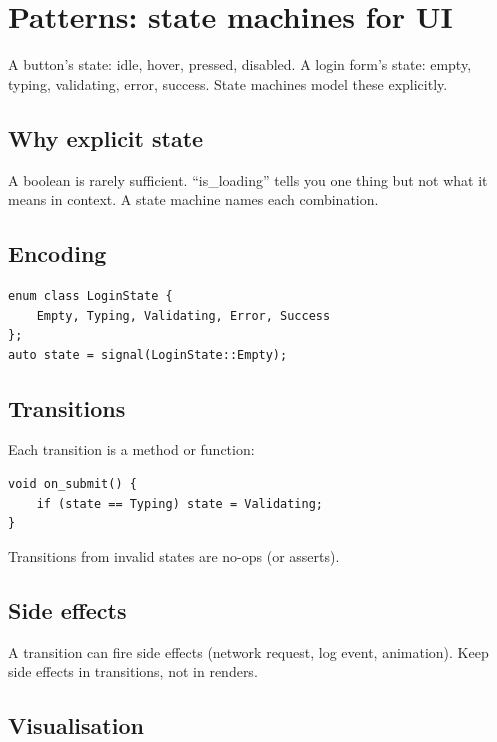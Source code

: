 \chapter{Patterns: state machines for UI}
\label{ch:uistate}

\begin{aside}
A button's state: idle, hover, pressed, disabled. A login
form's state: empty, typing, validating, error, success. State
machines model these explicitly.
\end{aside}

\section{Why explicit state}

A boolean is rarely sufficient. ``is\_loading'' tells you one
thing but not what it means in context. A state machine names
each combination.

\section{Encoding}

\begin{lstlisting}
enum class LoginState {
    Empty, Typing, Validating, Error, Success
};
auto state = signal(LoginState::Empty);
\end{lstlisting}

\section{Transitions}

Each transition is a method or function:

\begin{lstlisting}
void on_submit() {
    if (state == Typing) state = Validating;
}
\end{lstlisting}

Transitions from invalid states are no-ops (or asserts).

\section{Side effects}

A transition can fire side effects (network request, log
event, animation). Keep side effects in transitions, not
in renders.

\section{Visualisation}

